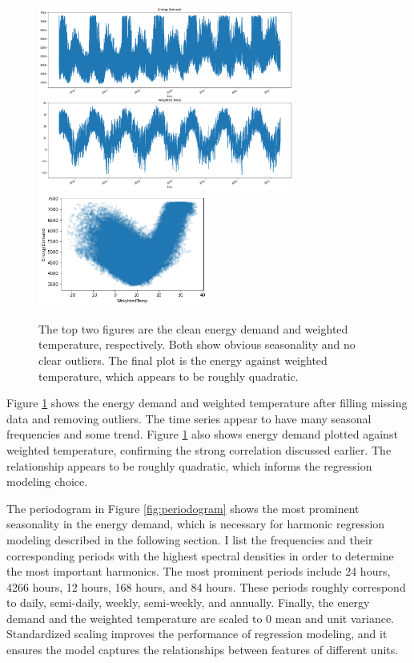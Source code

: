 \documentclass[12pt]{article}
\begin{document}
\begin{figure}[h!]
    \centering
    \includegraphics[width=0.75\textwidth]{figures/cleaned_data.png}
    \includegraphics[width=0.5\textwidth]{figures/power_vs_wtemp.png}
    \caption{The top two figures are the clean energy demand and weighted temperature, respectively. Both show obvious seasonality and no clear outliers. The final plot is the energy against weighted temperature, which appears to be roughly quadratic.}
    \label{fig:cleaned_data}
\end{figure}

Figure \ref{fig:cleaned_data} shows the energy demand and weighted temperature after filling missing data and removing outliers. The time series appear to have many seasonal frequencies and some trend. Figure \ref{fig:cleaned_data} also shows energy demand plotted against weighted temperature, confirming the strong correlation discussed earlier. The relationship appears to be roughly quadratic, which informs the regression modeling choice.

The periodogram in Figure \ref{fig:periodogram} shows the most prominent seasonality in the energy demand, which is necessary for harmonic regression modeling described in the following section. I list the frequencies and their corresponding periods with the highest spectral densities in order to determine the most important harmonics. The most prominent periods include 24 hours, 4266 hours, 12 hours, 168 hours, and 84 hours. These periods roughly correspond to daily, semi-daily, weekly, semi-weekly, and annually. Finally, the energy demand and the weighted temperature are scaled to 0 mean and unit variance. Standardized scaling improves the performance of regression modeling, and it ensures the model captures the relationships between features of different units.
\end{document}
